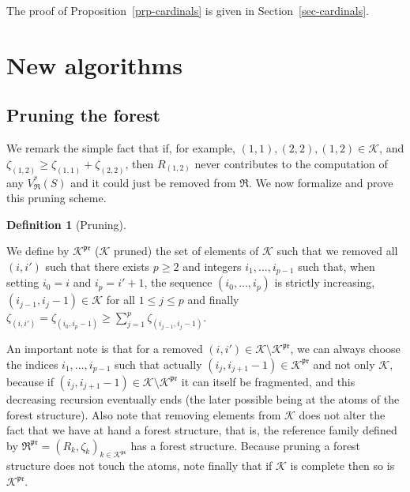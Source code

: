 \documentclass[
  11pt,
  a4paper,
]{article}
\theoremstyle{definition}
\theoremstyle{plain}
\theoremstyle{plain}
\theoremstyle{plain}
\theoremstyle{definition}
\newtheorem{definition}{Definition}[section]
\theoremstyle{remark}
\begin{document}
The proof of Proposition~\ref{prp-cardinals} is given in
Section~\ref{sec-cardinals}.

\section{New algorithms}\label{new-algorithms}

\subsection{Pruning the forest}\label{sec-pruning}

We remark the simple fact that if, for example,
\((1,1), (2,2), (1,2)\in\mathcal{K}\), and
\(\zeta_{(1,2)}\geq \zeta_{(1,1)}+\zeta_{(2,2)}\), then \(R_{(1,2)}\)
never contributes to the computation of any \(V^*_{\mathfrak{R}}(S)\)
and it could just be removed from \(\mathfrak{R}\). We now formalize and
prove this pruning scheme.

\begin{definition}[Pruning]\protect\hypertarget{def-pruning}{}\label{def-pruning}

We define by \(\mathcal{K}^{\mathfrak{pr}}\) (\(\mathcal{K}\) pruned)
the set of elements of \(\mathcal{K}\) such that we removed all
\((i,i')\) such that there exists \(p\geq2\) and integers
\(i_1,\dotsc,i_{p-1}\) such that, when setting \(i_0=i\) and
\(i_{p}=i'+1\), the sequence \((i_0,\dotsc,i_{p})\) is strictly
increasing, \((i_{j-1},i_{j}-1)\in\mathcal{K}\) for all
\(1\leq j\leq p\) and finally
\(\zeta_{(i,i')}=\zeta_{(i_0,i_{p}-1)}\geq \sum_{j=1}^{p} \zeta_{(i_{j-1}, i_{j}-1)}\).

\end{definition}

An important note is that for a removed
\((i,i')\in\mathcal{K}\setminus\mathcal{K}^{\mathfrak{pr}}\), we can
always choose the indices \(i_1,\dotsc,i_{p-1}\) such that actually
\((i_j,i_{j+1}-1)\in\mathcal{K}^{\mathfrak{pr}}\) and not only
\(\mathcal{K}\), because if
\((i_j,i_{j+1}-1)\in\mathcal{K}\setminus\mathcal{K}^{\mathfrak{pr}}\) it
can itself be fragmented, and this decreasing recursion eventually ends
(the later possible being at the atoms of the forest structure). Also
note that removing elements from \(\mathcal{K}\) does not alter the fact
that we have at hand a forest structure, that is, the reference family
defined by
\(\mathfrak{R}^{\mathfrak{pr}}=(R_k,\zeta_k)_{k\in\mathcal{K}^{\mathfrak{pr}}}\)
has a forest structure. Because pruning a forest structure does not
touch the atoms, note finally that if \(\mathcal{K}\) is complete then
so is \(\mathcal{K}^{\mathfrak{pr}}\).
\end{document}
